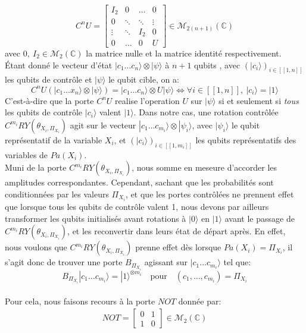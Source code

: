 \[C^nU =
\left[
\begin{array}{cccc}
    I_2 & 0 & \hdots & 0 \\
    0 & \ddots & \ddots & \vdots \\
    \vdots & \ddots & I_2 & 0 \\
    0 & \hdots & 0 & U
\end{array}
\right]
\in \mathcal{M}_{2(n+1)}(\mathbb{C})
\]
avec $0, \ I_2 \in \mathcal{M}_2(\mathbb{C})$ la matrice nulle et la matrice identité respectivement. 
\\
Étant donné le vecteur d'état $|c_1 \hdots c_n\rangle \otimes |\psi\rangle$ à $n+1$ qubits , avec $(|c_i\rangle)_{i\in[\![1,n]\!]}$ les qubits de contrôle et $|\psi\rangle$ le qubit cible, on a:
\[C^nU(|c_1 \hdots x_n\rangle \otimes |\psi\rangle) = |c_1 \hdots c_n\rangle \otimes U|\psi\rangle \iff \forall i \in [\![1,n]\!], \ |c_i\rangle = |1\rangle \]
C'est-à-dire que la porte $C^nU$ realise l'operation $U$ sur $|\psi\rangle$ si et seulement si \textit{tous} les qubits de contrôle $|c_i\rangle$ valent $|1\rangle$. 
Dans notre cas, une rotation contrôlée $C^{m_i}RY(\theta_{X_i, \Pi_{X_i}})$ agit sur le vecteur $|c_1 \hdots c_{m_i}\rangle \otimes |\psi_i\rangle$, avec $|\psi_i\rangle$ le qubit représentatif de la variable $X_i$, et $(|c_i\rangle)_{i\in[\![1,m_i]\!]}$ les qubits représentatifs des variables de $ Pa(X_i)$.
\\
Muni de la porte $C^{m_i}RY(\theta_{X_i, \Pi_{X_i}})$, nous somme en meseure d'accorder les amplitudes correspondantes. Cependant, sachant que les probabilités sont conditionnées par les valeurs $\Pi_{X_i}$, et que les portes contrôlées ne prennent effet que lorsque tous  les qubits de contrôle valent 1, nous devons par ailleurs transformer les qubits initialisés avant rotations à $|0\rangle$ en $|1\rangle$ avant le passage de $C^{m_i}RY(\theta_{X_i, \Pi_{X_i}})$, et les reconvertir dans leurs état de départ après.
En effet, nous voulons que $C^{m_i}RY(\theta_{X_i, \Pi_{X_i}})$ prenne effet dès lorsque $Pa(X_i)=\Pi_{X_i}$, il s'agit donc de trouver une porte $B_{\Pi_{X_i}}$ agissant sur $|c_1 \hdots c_{m_i}\rangle$ tel que:
\[
B_{\Pi_{X_i}}|c_1 \hdots c_{m_i}\rangle = |1\rangle^{\otimes m_i} \quad \mathrm{pour} \quad (c_1,\hdots,c_{m_i}) = \Pi_{X_i}
\]
\\
Pour cela, nous faisons recours à la porte $NOT$ donnée par:
\begin{align*}
NOT =
\left[
\begin{array}{cc}
    0 & 1 \\
    1 & 0
\end{array}
\right]
\in \mathcal{M}_{2}(\mathbb{C}) 
\end{align*}
